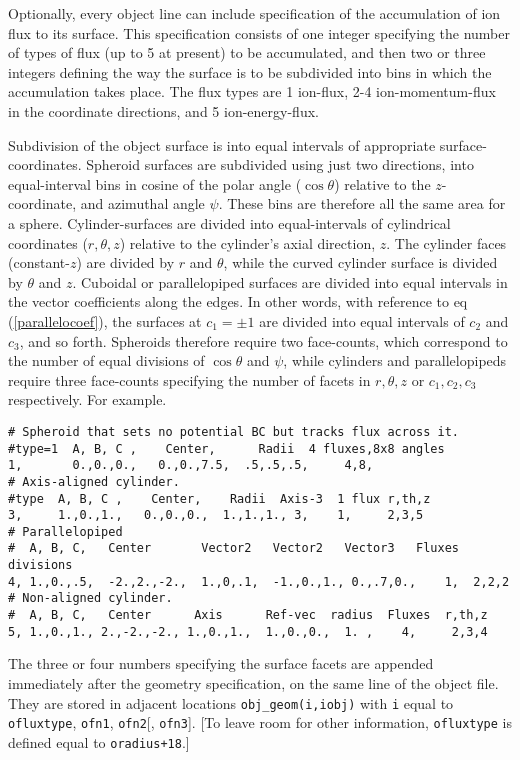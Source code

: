 \documentclass[12pt]{article}
\begin{document}
Optionally, every object line can include specification of the
accumulation of ion flux to its surface. This specification consists
of one integer specifying the number of types of flux (up to 5 at
present) to be accumulated, and then two or three integers defining
the way the surface is to be subdivided into bins in which the
accumulation takes place. The flux types are 1 ion-flux, 2-4
ion-momentum-flux in the coordinate directions, and 5 ion-energy-flux.

Subdivision of the object surface is into equal intervals of
appropriate surface-coordinates. Spheroid surfaces are subdivided
using just two directions, into equal-interval bins in cosine of the
polar angle ($\cos\theta$) relative to the $z$-coordinate, and
azimuthal angle $\psi$. These bins are therefore all the same
area for a sphere. Cylinder-surfaces are divided into equal-intervals of
cylindrical coordinates ($r,\theta,z$) relative to the cylinder's
axial direction, $z$. The cylinder faces (constant-$z$) are divided by
$r$ and $\theta$, while the curved cylinder surface is divided by
$\theta$ and $z$. Cuboidal or parallelopiped surfaces are divided
into equal intervals in the vector coefficients along the edges. In
other words, with reference to eq (\ref{parallelocoef}), the surfaces
at $c_1=\pm1$ are divided into equal intervals of $c_2$ and $c_3$, and
so forth. Spheroids therefore require two face-counts, which
correspond to the number of equal divisions of $\cos\theta$ and
$\psi$, while cylinders and parallelopipeds require three face-counts
specifying the number of facets in $r,\theta,z$ or $c_1,c_2,c_3$
respectively. For example.

\begin{verbatim}
# Spheroid that sets no potential BC but tracks flux across it.
#type=1  A, B, C ,    Center,      Radii  4 fluxes,8x8 angles
1,       0.,0.,0.,   0.,0.,7.5,  .5,.5,.5,     4,8,
# Axis-aligned cylinder.
#type  A, B, C ,    Center,    Radii  Axis-3  1 flux r,th,z
3,     1.,0.,1.,   0.,0.,0.,  1.,1.,1., 3,    1,     2,3,5
# Parallelopiped
#  A, B, C,   Center       Vector2   Vector2   Vector3   Fluxes divisions
4, 1.,0.,.5,  -2.,2.,-2.,  1.,0,.1,  -1.,0.,1., 0.,.7,0.,    1,  2,2,2
# Non-aligned cylinder.
#  A, B, C,   Center      Axis      Ref-vec  radius  Fluxes  r,th,z
5, 1.,0.,1., 2.,-2.,-2., 1.,0.,1.,  1.,0.,0.,  1. ,    4,     2,3,4
\end{verbatim}

The three or four numbers specifying the surface facets are appended
immediately after the geometry specification, on the same line of the
object file. They are stored in adjacent locations
\verb!obj_geom(i,iobj)! with \verb!i!  equal to \verb!ofluxtype!,
\verb!ofn1!, \verb!ofn2![, \verb!ofn3!].  [To leave room for other
  information, \verb!ofluxtype! is defined equal to \verb!oradius+18!.]
\end{document}
